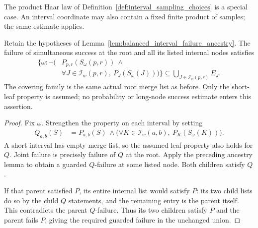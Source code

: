 The product Haar law of Definition~\ref{def:interval_sampling_choices}
is a special case. An interval coordinate may also contain a fixed
finite product of samples; the same estimate applies.

\begin{lemma}
    \label{lem:balanced_interval_joint_failure_ancestry}
    \leanok
    Retain the hypotheses of
    Lemma~\ref{lem:balanced_interval_failure_ancestry}. The failure of
    simultaneous success at the root and all its listed internal nodes
    satisfies
    \begin{align}
        \bigl\{\omega:\neg\bigl( & P_{p,r}(S_\omega(p,r))\ \land\nonumber                        \\
                                 & \forall J\in\mathcal I_w(p,r),\ P_J(S_\omega(J))\bigr)\bigr\}
        \subseteq\bigcup_{J\in\mathcal I_w(p,r)}E_J.
    \end{align}
    The covering family is the same actual root merge list as before.
    Only the short-leaf property is assumed; no probability or
    long-node success estimate enters this assertion.
\end{lemma}
\begin{proof}\leanok
    Fix $\omega$. Strengthen the property on each interval by setting
    \begin{align}
        Q_{a,b}(S) & =P_{a,b}(S)\ \land
        \bigl(\forall K\in\mathcal I_w(a,b),\ P_K(S_\omega(K))\bigr).
    \end{align}
    A short interval has empty merge list, so the assumed leaf property
    also holds for $Q$. Joint failure is precisely failure of $Q$ at
    the root. Apply the preceding ancestry lemma to obtain a guarded
    $Q$-failure at some listed node. Both children satisfy $Q$.

    If that parent satisfied $P$, its entire internal list would satisfy
    $P$: its two child lists do so by the child $Q$ statements, and the
    remaining entry is the parent itself. This contradicts the parent
    $Q$-failure. Thus its two children satisfy $P$ and the parent fails
    $P$, giving the required guarded failure in the unchanged union.
\end{proof}


